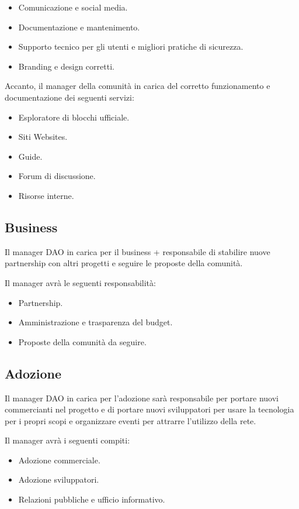\documentclass{article}
\begin{document}
\begin{itemize}
  \item Comunicazione e social media.
  \item Documentazione e mantenimento.
  \item Supporto tecnico per gli utenti e migliori pratiche di sicurezza.
  \item Branding e design corretti.
\end{itemize}

Accanto, il manager della comunità in carica del corretto funzionamento e documentazione dei seguenti servizi:

\begin{itemize}
  \item Esploratore di blocchi ufficiale.
  \item Siti Websites.
  \item Guide.
  \item Forum di discussione.
  \item Risorse interne.
\end{itemize}

\subsection{Business}

Il manager DAO in carica per il business + responsabile di stabilire nuove partnership con altri progetti e seguire le proposte della comunità.

Il manager avrà le seguenti responsabilità:

\begin{itemize}
  \item Partnership.
  \item Amministrazione e trasparenza del budget.
  \item Proposte della comunità da seguire.
\end{itemize}

\subsection{Adozione}

Il manager DAO in carica per l'adozione sarà responsabile per portare nuovi commercianti nel progetto e di portare nuovi sviluppatori per usare la tecnologia per i propri scopi e organizzare eventi per attrarre l'utilizzo della rete.

Il manager avrà i seguenti compiti:

\begin{itemize}
  \item Adozione commerciale.
  \item Adozione sviluppatori.
  \item Relazioni pubbliche e ufficio informativo.
\end{itemize}
\end{document}
